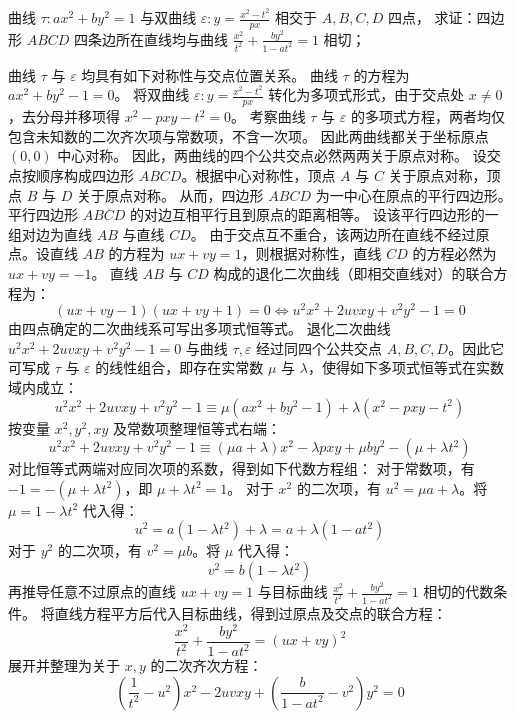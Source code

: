 \begin{example}
曲线 $\tau: ax^2 + by^2 = 1$ 与双曲线 $\varepsilon: y = \frac{x^2 - t^2}{px}$ 相交于 $A,B,C,D$ 四点，
求证：四边形 $ABCD$ 四条边所在直线均与曲线 $\frac{x^2}{t^2} + \frac{by^2}{1 - at^2} = 1$ 相切；
\end{example}
\begin{solution}
曲线 $\tau$ 与 $\varepsilon$ 均具有如下对称性与交点位置关系。
曲线 $\tau$ 的方程为 $ax^2 + by^2 - 1 = 0$。
将双曲线 $\varepsilon: y = \frac{x^2 - t^2}{px}$ 转化为多项式形式，由于交点处 $x \neq 0$，去分母并移项得 $x^2 - pxy - t^2 = 0$。
考察曲线 $\tau$ 与 $\varepsilon$ 的多项式方程，两者均仅包含未知数的二次齐次项与常数项，不含一次项。
因此两曲线都关于坐标原点 $(0,0)$ 中心对称。
因此，两曲线的四个公共交点必然两两关于原点对称。
设交点按顺序构成四边形 $ABCD$。根据中心对称性，顶点 $A$ 与 $C$ 关于原点对称，顶点 $B$ 与 $D$ 关于原点对称。
从而，四边形 $ABCD$ 为一中心在原点的平行四边形。\\
平行四边形 $ABCD$ 的对边互相平行且到原点的距离相等。
设该平行四边形的一组对边为直线 $AB$ 与直线 $CD$。
由于交点互不重合，该两边所在直线不经过原点。设直线 $AB$ 的方程为 $ux + vy = 1$，则根据对称性，直线 $CD$ 的方程必然为 $ux + vy = -1$。
直线 $AB$ 与 $CD$ 构成的退化二次曲线（即相交直线对）的联合方程为：
$$ (ux + vy - 1)(ux + vy + 1) = 0 \Leftrightarrow u^2 x^2 + 2uv xy + v^2 y^2 - 1 = 0 $$
由四点确定的二次曲线系可写出多项式恒等式。
退化二次曲线 $u^2 x^2 + 2uv xy + v^2 y^2 - 1 = 0$ 与曲线 $\tau,\varepsilon$ 经过同四个公共交点 $A,B,C,D$。因此它可写成 $\tau$ 与 $\varepsilon$ 的线性组合，即存在实常数 $\mu$ 与 $\lambda$，使得如下多项式恒等式在实数域内成立：
$$ u^2 x^2 + 2uv xy + v^2 y^2 - 1 \equiv \mu(ax^2 + by^2 - 1) + \lambda(x^2 - pxy - t^2) $$
按变量 $x^2, y^2, xy$ 及常数项整理恒等式右端：
$$ u^2 x^2 + 2uv xy + v^2 y^2 - 1 \equiv (\mu a + \lambda)x^2 - \lambda p xy + \mu b y^2 - (\mu + \lambda t^2) $$
对比恒等式两端对应同次项的系数，得到如下代数方程组：
对于常数项，有 $-1 = -(\mu + \lambda t^2)$，即 $\mu + \lambda t^2 = 1$。
对于 $x^2$ 的二次项，有 $u^2 = \mu a + \lambda$。将 $\mu = 1 - \lambda t^2$ 代入得：
$$ u^2 = a(1 - \lambda t^2) + \lambda = a + \lambda(1 - at^2) $$
对于 $y^2$ 的二次项，有 $v^2 = \mu b$。将 $\mu$ 代入得：
$$ v^2 = b(1 - \lambda t^2) $$
再推导任意不过原点的直线 $ux + vy = 1$ 与目标曲线 $\frac{x^2}{t^2} + \frac{by^2}{1 - at^2} = 1$ 相切的代数条件。
将直线方程平方后代入目标曲线，得到过原点及交点的联合方程：
$$ \frac{x^2}{t^2} + \frac{by^2}{1 - at^2} = (ux + vy)^2 $$
展开并整理为关于 $x, y$ 的二次齐次方程：
$$ \left(\frac{1}{t^2} - u^2\right)x^2 - 2uv xy + \left(\frac{b}{1 - at^2} - v^2\right)y^2 = 0 $$

\end{solution}
